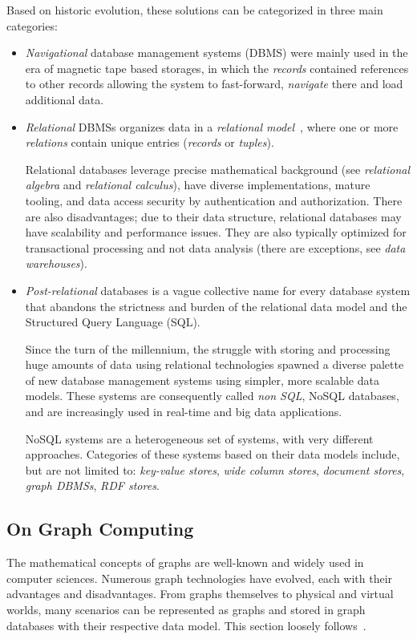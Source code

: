 Based on historic evolution, these solutions can be categorized in three main categories:
\begin{itemize}[topsep=0pt]
  \item \emph{Navigational} database management systems (DBMS) were mainly used in the era of magnetic tape based storages, in which the \emph{records} contained references to other records allowing the system to fast-forward, \emph{navigate} there and load additional data.

  \item \emph{Relational} DBMSs organizes data in a \emph{relational model}~\cite{codd}, where one or more \emph{relations} contain unique entries (\emph{records} or \emph{tuples}).

  Relational databases leverage precise mathematical background (see \emph{relational algebra} and \emph{relational calculus}), have diverse implementations, mature tooling, and data access security by authentication and authorization. There are also disadvantages; due to their data structure, relational databases may have scalability and performance issues. They are also typically optimized for transactional processing and not data analysis (there are exceptions, see \emph{data warehouses}).

  \item \emph{Post-relational} databases is a vague collective name for every database system that abandons the strictness and burden of the relational data model and the Structured Query Language (SQL).

  Since the turn of the millennium, the struggle with storing and processing huge amounts of data using relational technologies spawned a diverse palette of new database management systems using simpler, more scalable data models. These systems are consequently called \emph{non SQL}, NoSQL databases, and are increasingly used in real-time and big data applications.

  NoSQL systems are a heterogeneous set of systems, with very different approaches. Categories of these systems based on their data models include, but are not limited to: \emph{key-value stores}, \emph{wide column stores}, \emph{document stores}, \emph{graph DBMSs}, \emph{RDF stores}.
\end{itemize}

\subsection{On Graph Computing}
The mathematical concepts of graphs are well-known and widely used in computer sciences. Numerous graph technologies have evolved, each with their advantages and disadvantages. From graphs themselves to physical and virtual worlds, many scenarios can be represented as graphs and stored in graph databases with their respective data model. This section loosely follows~\cite{scm, On_Graph_Computing}.


